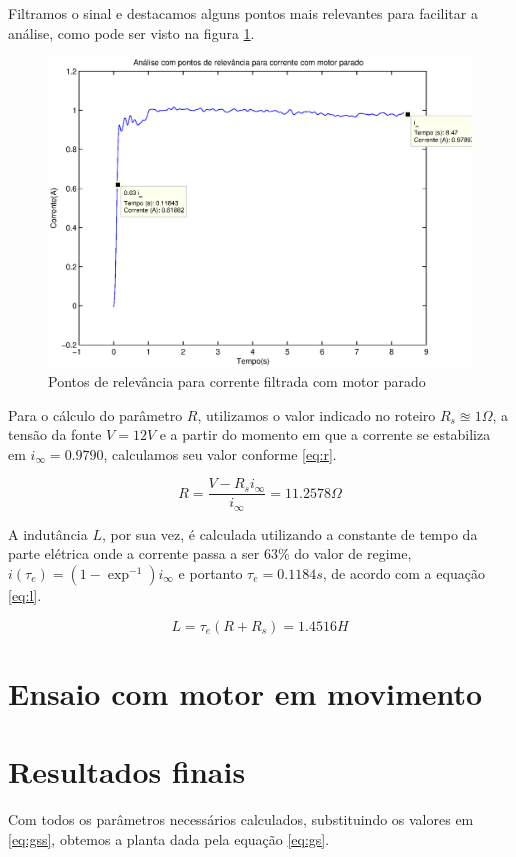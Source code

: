 \documentclass{article}
\begin{document}
Filtramos o sinal e destacamos alguns pontos mais relevantes para facilitar a análise, como pode ser visto na figura \ref{fig:riseI}.
\begin{figure}[H]
	\centering
	\includegraphics[width=0.8\linewidth]{../riseI}
	\caption{Pontos de relevância para corrente filtrada com motor parado}
	\label{fig:riseI}
\end{figure}

Para o cálculo do parâmetro $R$, utilizamos o valor indicado no roteiro\cite{bb:roteiro} $R_s\approxeq1 \Omega$, a tensão da fonte $V=12 V$ e a partir do momento em que a corrente se estabiliza em $i_\infty=0.9790$, calculamos seu valor conforme \ref{eq:r}.

\begin{equation}
\label{eq:r}
R = \frac{V-R_si_\infty}{i_\infty}=11.2578\Omega
\end{equation}

A indutância $L$, por sua vez, é calculada utilizando a constante de tempo da parte elétrica onde a corrente passa a ser $63\%$ do valor de regime, $i(\tau_e)=(1-\exp^{-1})i_\infty$ e portanto
$\tau_e=0.1184s$, de acordo com a equação \ref{eq:l}.

\begin{equation}
\label{eq:l}
L = \tau_e(R+R_s)=1.4516H
\end{equation}

\section{Ensaio com motor em movimento}

\section{Resultados finais}
Com todos os parâmetros necessários calculados, substituindo os valores em \ref{eq:gss}, obtemos a planta dada pela equação \ref{eq:gs}.
\end{document}
